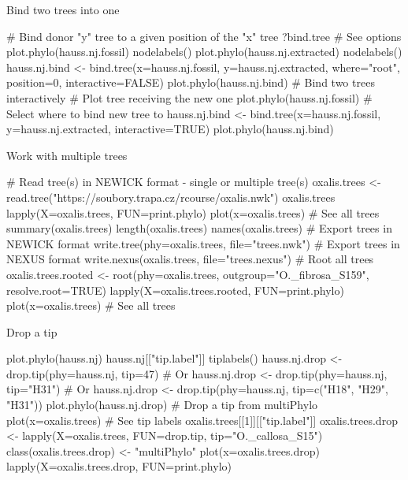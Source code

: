 \documentclass[compress, xelatex, 11pt, xcolor=svgnames, aspectratio=169, url={hyphens, lowtilde}]{beamer}
\begin{document}
\begin{frame}[fragile]{Bind two trees into one}
	\begin{spluscode}
    # Bind donor "y" tree to a given position of the "x" tree
    ?bind.tree # See options
    plot.phylo(hauss.nj.fossil)
    nodelabels()
    plot.phylo(hauss.nj.extracted)
    nodelabels()
    hauss.nj.bind <- bind.tree(x=hauss.nj.fossil, y=hauss.nj.extracted,
      where="root", position=0, interactive=FALSE)
    plot.phylo(hauss.nj.bind)
    # Bind two trees interactively
    # Plot tree receiving the new one
    plot.phylo(hauss.nj.fossil)
    # Select where to bind new tree to
    hauss.nj.bind <- bind.tree(x=hauss.nj.fossil, y=hauss.nj.extracted,
      interactive=TRUE)
    plot.phylo(hauss.nj.bind)
	\end{spluscode}
\end{frame}

\begin{frame}[fragile]{Work with multiple trees}
	\begin{spluscode}
    # Read tree(s) in NEWICK format - single or multiple tree(s)
    oxalis.trees <- read.tree("https://soubory.trapa.cz/rcourse/oxalis.nwk")
    oxalis.trees
    lapply(X=oxalis.trees, FUN=print.phylo)
    plot(x=oxalis.trees) # See all trees
    summary(oxalis.trees)
    length(oxalis.trees)
    names(oxalis.trees)
    # Export trees in NEWICK format
    write.tree(phy=oxalis.trees, file="trees.nwk")
    # Export trees in NEXUS format
    write.nexus(oxalis.trees, file="trees.nexus")
    # Root all trees
    oxalis.trees.rooted <- root(phy=oxalis.trees, outgroup="O._fibrosa_S159",
      resolve.root=TRUE)
    lapply(X=oxalis.trees.rooted, FUN=print.phylo)
    plot(x=oxalis.trees) # See all trees
	\end{spluscode}
\end{frame}

\begin{frame}[fragile]{Drop a tip}
	\begin{spluscode}
    plot.phylo(hauss.nj)
    hauss.nj[["tip.label"]]
    tiplabels()
    hauss.nj.drop <- drop.tip(phy=hauss.nj, tip=47) # Or
    hauss.nj.drop <- drop.tip(phy=hauss.nj, tip="H31") # Or
    hauss.nj.drop <- drop.tip(phy=hauss.nj, tip=c("H18", "H29", "H31"))
    plot.phylo(hauss.nj.drop)
    # Drop a tip from multiPhylo
    plot(x=oxalis.trees)
    # See tip labels
    oxalis.trees[[1]][["tip.label"]]
    oxalis.trees.drop <- lapply(X=oxalis.trees, FUN=drop.tip,
      tip="O._callosa_S15")
    class(oxalis.trees.drop) <- "multiPhylo"
    plot(x=oxalis.trees.drop)
    lapply(X=oxalis.trees.drop, FUN=print.phylo)
	\end{spluscode}
\end{frame}
\end{document}
